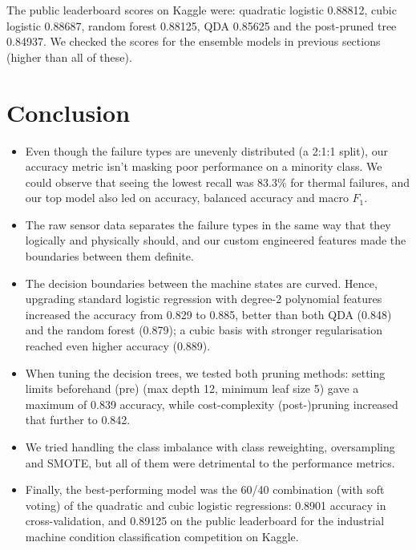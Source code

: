 \documentclass[11pt]{article}
\begin{document}
The public leaderboard scores on Kaggle were: quadratic logistic 0.88812, cubic logistic 0.88687, random forest 0.88125, QDA 0.85625 and the post-pruned tree 0.84937. We checked the scores for the ensemble models in previous sections (higher than all of these).

\section{Conclusion}

\begin{itemize}
  \item Even though the failure types are unevenly distributed (a 2:1:1 split), our accuracy metric isn't masking poor performance on a minority class. We could observe that seeing the lowest recall was 83.3\% for thermal failures, and our top model also led on accuracy, balanced accuracy and macro $F_1$.
  \item The raw sensor data separates the failure types in the same way that they logically and physically should, and our custom engineered features made the boundaries between them definite.
  \item The decision boundaries between the machine states are curved. Hence, upgrading standard logistic regression with degree-2 polynomial features increased the accuracy from 0.829 to 0.885, better than both QDA (0.848) and the random forest (0.879); a cubic basis with stronger regularisation reached even higher accuracy (0.889).
  \item When tuning the decision trees, we tested both pruning methods: setting limits beforehand (pre) (max depth 12, minimum leaf size 5) gave a maximum of 0.839 accuracy, while cost-complexity (post-)pruning increased that further to 0.842.
  \item We tried handling the class imbalance with class reweighting, oversampling and SMOTE, but all of them were detrimental to the performance metrics.
  \item Finally, the best-performing model was the 60/40 combination (with soft voting) of the quadratic and cubic logistic regressions: 0.8901 accuracy in cross-validation, and 0.89125 on the public leaderboard for the industrial machine condition classification competition on Kaggle.
\end{itemize}
\end{document}
